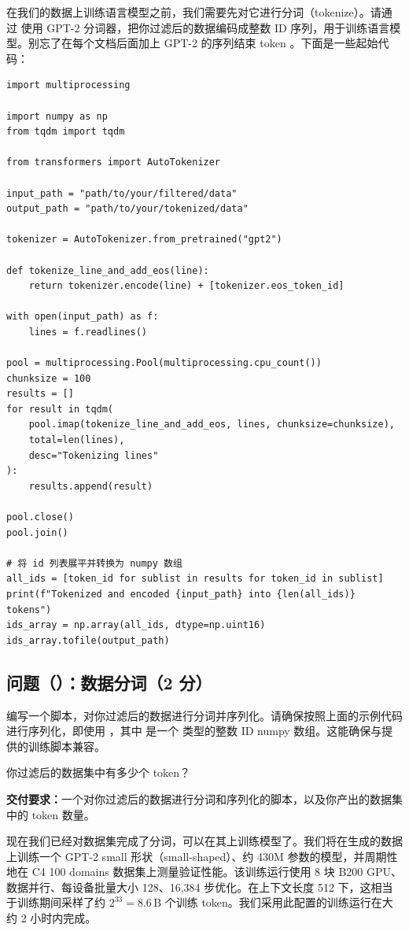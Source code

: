 在我们的数据上训练语言模型之前，我们需要先对它进行分词（tokenize）。请通过  使用 GPT-2 分词器，把你过滤后的数据编码成整数 ID 序列，用于训练语言模型。别忘了在每个文档后面加上 GPT-2 的序列结束 token 。下面是一些起始代码：

\begin{lstlisting}
import multiprocessing

import numpy as np
from tqdm import tqdm

from transformers import AutoTokenizer

input_path = "path/to/your/filtered/data"
output_path = "path/to/your/tokenized/data"

tokenizer = AutoTokenizer.from_pretrained("gpt2")

def tokenize_line_and_add_eos(line):
    return tokenizer.encode(line) + [tokenizer.eos_token_id]

with open(input_path) as f:
    lines = f.readlines()

pool = multiprocessing.Pool(multiprocessing.cpu_count())
chunksize = 100
results = []
for result in tqdm(
    pool.imap(tokenize_line_and_add_eos, lines, chunksize=chunksize),
    total=len(lines),
    desc="Tokenizing lines"
):
    results.append(result)

pool.close()
pool.join()

# 将 id 列表展平并转换为 numpy 数组
all_ids = [token_id for sublist in results for token_id in sublist]
print(f"Tokenized and encoded {input_path} into {len(all_ids)} tokens")
ids_array = np.array(all_ids, dtype=np.uint16)
ids_array.tofile(output_path)
\end{lstlisting}

\subsection*{问题（）：数据分词（2 分）}

编写一个脚本，对你过滤后的数据进行分词并序列化。请确保按照上面的示例代码进行序列化，即使用 ，其中  是一个  类型的整数 ID numpy 数组。这能确保与提供的训练脚本兼容。

你过滤后的数据集中有多少个 token？

\textbf{交付要求：}一个对你过滤后的数据进行分词和序列化的脚本，以及你产出的数据集中的 token 数量。

现在我们已经对数据集完成了分词，可以在其上训练模型了。我们将在生成的数据上训练一个 GPT-2 small 形状（small-shaped）、约 430M 参数的模型，并周期性地在 C4 100 domains 数据集上测量验证性能。该训练运行使用 8 块 B200 GPU、数据并行、每设备批量大小 128、16,384 步优化。在上下文长度 512 下，这相当于训练期间采样了约 $2^{33} = 8.6\,\mathrm{B}$ 个训练 token。我们采用此配置的训练运行在大约 2 小时内完成。

